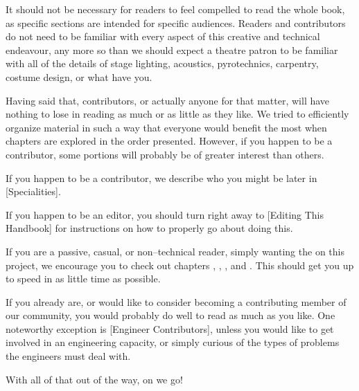 

It should not be necessary for readers to feel compelled to read the whole book, as specific sections are intended for specific audiences. Readers and contributors do not need to be familiar with every aspect of this creative and technical endeavour, any more so than we should expect a theatre patron to be familiar with all of the details of stage lighting, acoustics, pyrotechnics, carpentry, costume design, or what have you.

Having said that, contributors, or actually anyone for that matter, will have nothing to lose in reading as much or as little as they like. We tried to efficiently organize material in such a way that everyone would benefit the most when chapters are explored in the order presented. However, if you happen to be a contributor, some portions will probably be of greater interest than others.

If you happen to be a contributor, we describe who you might be later in [Specialities].

If you happen to be an editor, you should turn right away to [Editing This Handbook] for instructions on how to properly go about doing this.

If you are a passive, casual, or non--technical reader, simply wanting the  on this project, we encourage you to check out chapters \in[Leitmotifs], , , and \in[Timeline]. This should get you up to speed in as little time as possible.

If you already are, or would like to consider becoming a contributing member of our community, you would probably do well to read as much as you like. One noteworthy exception is [Engineer Contributors], unless you would like to get involved in an engineering capacity, or simply curious of the types of problems the engineers must deal with.

With all of that out of the way, on we go!

\StopChapter

